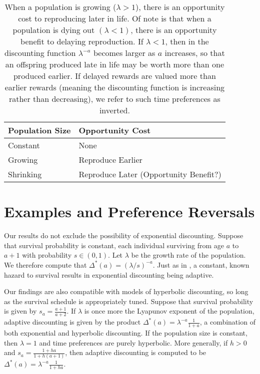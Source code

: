 \documentclass[titlepage, hidelinks, 12pt]{article}
\theoremstyle{plain}
\theoremstyle{remark}
\theoremstyle{definition}
\begin{document}
\begin{table}[h]
    \centering
\begin{tabular}{|l|l|}
    \hline
Population Size & Opportunity Cost            \\ \hline \hline
Constant             & None                            \\
Growing         & Reproduce Earlier \\
Shrinking       & Reproduce Later (Opportunity Benefit?) \\ \hline
\end{tabular}
\caption[Indicates opportunity cost as determined by demographic growth/decay.]{When a population is growing ($\lambda > 1$), there is an opportunity cost to reproducing later in life. Of note is that 
when a population is dying out $(\lambda < 1)$, there is an opportunity benefit to delaying reproduction. If $\lambda < 1$, then in 
the discounting function
$\lambda^{-a}$ becomes larger as $a$ increases, so that an offspring produced late in life may be worth more than one produced earlier. If delayed
rewards are valued more than earlier rewards (meaning the discounting function is increasing rather than decreasing), we 
refer to such time preferences as inverted.}
\end{table}

\section{Examples and Preference Reversals}
Our results do not exclude the possibility of exponential discounting. Suppose that survival probability is constant, each individual
surviving from age $a$ to $a+1$ with probability $s\in(0, 1)$. Let $\lambda$ be the growth rate of the population. We therefore compute
that $\Delta^*(a) = (\lambda/s)^{-a}$. Just as in \cite{sozou98}, a constant, known hazard to survival results in exponential discounting
being adaptive. 

Our findings are also compatible with models of hyperbolic discounting, so long as the survival schedule is appropriately tuned. Suppose
that survival probability is given by $s_a = \frac{a+1}{a+2}$. If $\lambda$ is once more the Lyapunov exponent of the population, adaptive
discounting is given by the product $\Delta^*(a) = \lambda^{-a}\frac{1}{1+a}$, a combination of both exponential and hyperbolic discounting. 
If the population size is constant, then $\lambda = 1$ and time preferences are purely hyperbolic. More generally, if 
$h>0$ and $s_a = \frac{1+ha}{1 + h(a+1)}$, then adaptive discounting
is computed to be $\Delta^*(a) = \lambda^{-a}\frac{1}{1+ha}$. 
\end{document}
